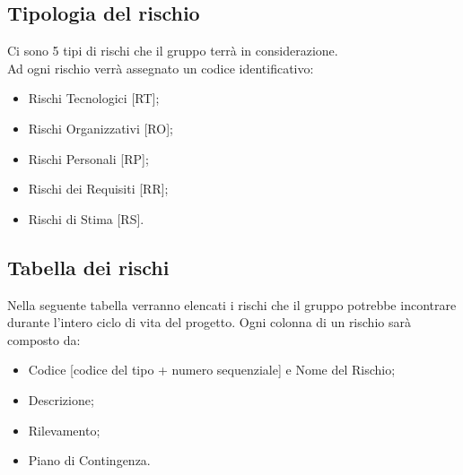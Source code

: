 \subsection{Tipologia del rischio}
Ci sono 5 tipi di rischi che il gruppo \Gruppo{} terrà in considerazione. 
\\Ad ogni rischio verrà assegnato un codice identificativo:
\begin{itemize}
	\item Rischi Tecnologici [RT];
	\item Rischi Organizzativi [RO];
	\item Rischi Personali [RP];
	\item Rischi dei Requisiti [RR];
	\item Rischi di Stima [RS].
\end{itemize}

\subsection{Tabella dei rischi}
Nella seguente tabella verranno elencati i rischi che il gruppo \Gruppo{} potrebbe incontrare durante l'intero ciclo di vita del progetto.
Ogni colonna di un rischio sarà composto da:
\begin{itemize}
	\item Codice [codice del tipo + numero sequenziale] e Nome del Rischio;
	\item Descrizione;
	\item Rilevamento;
	\item Piano di Contingenza.
\end{itemize}

